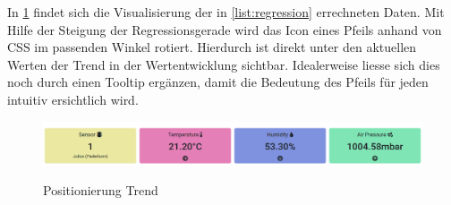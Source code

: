 In \cref{fig:posTrend} findet sich die Visualisierung der in \cref{list:regression} errechneten Daten.
Mit Hilfe der Steigung der Regressionsgerade wird das Icon eines Pfeils anhand von CSS im passenden Winkel rotiert.
Hierdurch ist direkt unter den aktuellen Werten der Trend in der Wertentwicklung sichtbar.
Idealerweise liesse sich dies noch durch einen Tooltip ergänzen, damit die Bedeutung des Pfeils für jeden intuitiv ersichtlich wird.

\begin{figure}[h!!]
    \centering
    \begin{minipage}[t]{1\textwidth}
        \caption{Positionierung Trend}
        \includegraphics[width=1\textwidth]{img/konzept-trend.png}\\
        \label{fig:posTrend}
    \end{minipage}
\end{figure}
